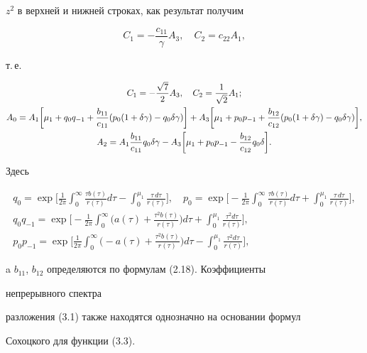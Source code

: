 \begin{pf}
$z^2$ в верхней и нижней строках, как результат получим 


$$ 


C_1=-\frac{c_{11}}{\gamma}A_3,\quad C_2=c_{22}A_1, 


$$ 


т.\,е. 


\begin{gather} 


C_1=-\frac{\sqrt{7}}{2}A_3,\quad C_2=\frac{1}{\sqrt{2}}A_1; \\ 


% 


A_0=A_1\bigg[\mu_1+q_0q_{-1}+\frac{b_{11}}{c_{11}} 


(p_0(1+\delta\gamma)-q_0\delta\gamma)\bigg]+A_3\bigg[\mu_1+p_0p_{-1} 


+\frac{b_{12}}{c_{12}}(p_0(1+\delta\gamma)-q_0\delta\gamma)\bigg], 


\notag \\ 


% 


A_2=A_1\frac{b_{11}}{c_{11}}q_0\delta\gamma-A_3\bigg[\mu_1+p_0p_{-1} 


-\frac{b_{12}}{c_{12}}q_0\delta\bigg]. 


\end{gather} 


Здесь 


\begin{gather*} 


q_0=\exp\bigg[\frac{1}{2\pi}\int^\infty_0 


\frac{\tau b(\tau)}{r(\tau)}d\tau-\int^{\mu_1}_0 


\frac{\tau\,d\tau}{r(\tau)}\bigg],\quad 


p_0=\exp\bigg[-\frac{1}{2\pi}\int^\infty_0 


\frac{\tau b(\tau)}{r(\tau)}d\tau+\int^{\mu_1}_0 


\frac{\tau\,d\tau}{r(\tau)}\bigg], \\ 


% 


q_0q_{-1}=\exp\bigg[-\frac{1}{2\pi}\int^\infty_0\bigg( 


a(\tau)+\frac{\tau^2b(\tau)}{r(\tau)}\bigg)d\tau+ 


\int^{\mu_1}_0 \frac{\tau^2d\tau}{r(\tau)}\bigg], \\ 


% 


p_0p_{-1}=\exp\bigg[\frac{1}{2\pi}\int^\infty_0\bigg( 


-a(\tau)+\frac{\tau^2b(\tau)}{r(\tau)}\bigg)d\tau- 


\int^{\mu_1}_0 \frac{\tau^2d\tau}{r(\tau)}\bigg],


\end{gather*} 


a $b_{11}$, $b_{12}$ определяются по формулам (2.18). Коэффициенты 


непрерывного спектра 


разложения (3.1) также находятся однозначно на основании формул 


Сохоцкого для функции (3.3). 


\end{pf} 


